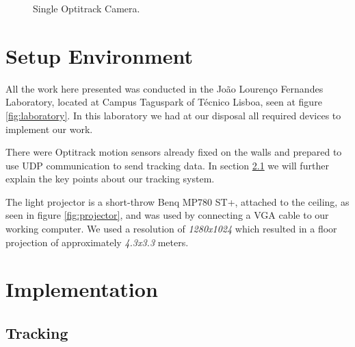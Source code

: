 \begin{figure}[!t]
    \caption{Single Optitrack Camera.}
    \label{fig:optitracksensor}
    \endminipage
\end{figure}

\section{Setup Environment}

All the work here presented was conducted in the Jo\~ao Louren\c{c}o Fernandes Laboratory, located at Campus Taguspark of T\'ecnico Lisboa, seen at figure \ref{fig:laboratory}.
In this laboratory we had at our disposal all required devices to implement our work.

There were Optitrack motion sensors already fixed on the walls and prepared to use UDP communication to send tracking data. 
In section \ref{prototype-tracking} we will further explain the key points about our tracking system.

The light projector is a short-throw Benq MP780 ST+, attached to the ceiling, as seen in figure \ref{fig:projector}, and
was used by connecting a VGA cable to our working computer. We used a resolution of \textit{1280x1024} which resulted in a floor projection of approximately \textit{4.3x3.3} 
meters.

\section{Implementation}

\subsection{Tracking}
\label{prototype-tracking}

